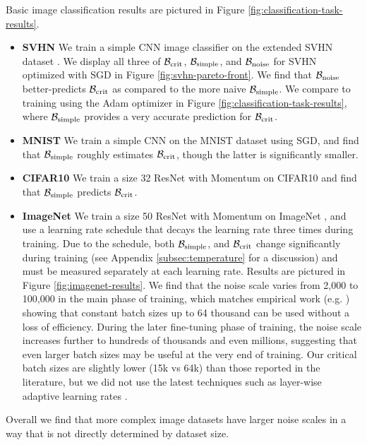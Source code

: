 \documentclass[english]{article}
\newcommand{\CB}{{\cal B}}
\begin{document}
Basic image classification results are pictured in Figure \ref{fig:classification-task-results}.
\begin{itemize}
\item {\bf SVHN }   We train a simple CNN image classifier on the extended SVHN dataset \cite{Netzer2011ReadingDI}.  We display all three of $\CB_{\rm crit}$, $\CB_{\rm simple}$, and $\CB_{\rm noise}$ for SVHN optimized with SGD in Figure \ref{fig:svhn-pareto-front}. We find that $\CB_{\rm noise}$ better-predicts $\CB_{\rm crit}$ as compared to the more naive $\CB_{\rm simple}$.  We  compare to training using  the Adam optimizer \cite{kingma2014adam} in Figure \ref{fig:classification-task-results}, where $\CB_{\rm simple}$ provides a very accurate prediction for $\CB_{\rm crit}$.
\item {\bf MNIST} We train a simple CNN on the MNIST dataset \cite{lecun-mnisthandwrittendigit-2010}  using SGD, and find that $\CB_{\rm simple}$ roughly estimates $\CB_{\rm crit}$, though the latter is significantly smaller.
\item {\bf CIFAR10}  We train a size 32 ResNet  \cite{DBLP:journals/corr/HeZRS15} with Momentum on CIFAR10 \cite{Krizhevsky2009LearningML}  and find that $\CB_{\rm simple}$ predicts $\CB_{\rm crit}$.
\item {\bf ImageNet}  We train a size 50 ResNet \cite{DBLP:journals/corr/HeZRS15}  with Momentum on ImageNet \cite{imagenet_cvpr09}, and use a learning rate schedule that decays the learning rate three times during training.  Due to the schedule, both $\CB_{\rm simple}$, and $\CB_{\rm crit}$ change significantly during training  (see Appendix \ref{subsec:temperature} for a discussion) and must be measured separately at each learning rate.  Results are pictured in Figure \ref{fig:imagenet-results}.  We find that the noise scale varies from 2,000 to 100,000 in the main phase of training, which matches empirical work (e.g. \cite{1807.11205}) showing that constant batch sizes up to 64 thousand can be used without a loss of efficiency.  During the later fine-tuning phase of training, the noise scale increases further to hundreds of thousands and even millions, suggesting that even larger batch sizes may be useful at the very end of training.  Our critical batch sizes are slightly lower (15k vs 64k) than those reported in the literature, but we did not use the latest techniques such as layer-wise adaptive learning rates \cite{1708.03888}.
\end{itemize}

Overall we find that more complex image datasets have larger noise scales in a way that is not directly determined by dataset size.
\end{document}
